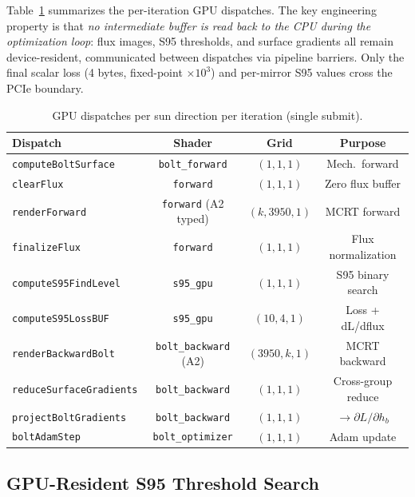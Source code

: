 \documentclass{CVM}
\begin{document}
Table~\ref{tab:dispatch} summarizes the per-iteration GPU dispatches. The key
engineering property is that \emph{no intermediate buffer is read back to the
CPU during the optimization loop}: flux images, S95 thresholds, and surface
gradients all remain device-resident, communicated between dispatches via
pipeline barriers. Only the final scalar loss (4 bytes, fixed-point
$\times 10^3$) and per-mirror S95 values cross the PCIe boundary.

\begin{table}[t]
\centering
\caption{GPU dispatches per sun direction per iteration (single submit).}
\label{tab:dispatch}
\small
\begin{tabular}{lccc}
\toprule
Dispatch & Shader & Grid & Purpose \\
\midrule
\verb|computeBoltSurface| & \verb|bolt_forward| & $(1,1,1)$ & Mech.\ forward \\
\verb|clearFlux| & \verb|forward| & $(1,1,1)$ & Zero flux buffer \\
\verb|renderForward| & \verb|forward| (A2 typed) & $(k,3950,1)$ & MCRT forward \\
\verb|finalizeFlux| & \verb|forward| & $(1,1,1)$ & Flux normalization \\
\verb|computeS95FindLevel| & \verb|s95_gpu| & $(1,1,1)$ & S95 binary search \\
\verb|computeS95LossBUF| & \verb|s95_gpu| & $(10,4,1)$ & Loss + dL/dflux \\
\verb|renderBackwardBolt| & \verb|bolt_backward| (A2) & $(3950,k,1)$ & MCRT backward \\
\verb|reduceSurfaceGradients| & \verb|bolt_backward| & $(1,1,1)$ & Cross-group reduce \\
\verb|projectBoltGradients| & \verb|bolt_backward| & $(1,1,1)$ & $\rightarrow \partial L/\partial h_b$ \\
\verb|boltAdamStep| & \verb|bolt_optimizer| & $(1,1,1)$ & Adam update \\
\bottomrule
\end{tabular}
\end{table}

\subsection{GPU-Resident S95 Threshold Search}
\label{sec:s95}
\end{document}
